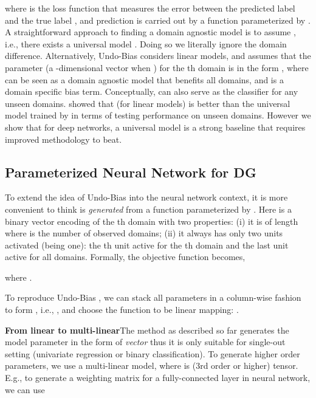 \documentclass[10pt,twocolumn,letterpaper]{article}
\begin{document}
\noindent where  is the loss function that measures the error between the predicted label  and the true label , and  prediction is carried out by a function  parameterized by . A straightforward approach to finding a domain agnostic model is to assume , i.e., there exists a universal model . Doing so we literally ignore the domain difference. Alternatively, Undo-Bias \cite{ECCV12_Khosla} considers linear models, and assumes that the parameter (a -dimensional vector when ) for the th domain is in the form , where  can be seen as a domain agnostic model that benefits all domains, and  is a domain specific bias term. Conceptually,  can also serve as the classifier  for any unseen domains. \cite{ECCV12_Khosla} showed that (for linear models)  is better than the universal model  trained by  in terms of testing performance on unseen domains. However we show that for deep networks, a universal model  is a strong baseline that requires improved methodology to beat.

\subsection{Parameterized Neural Network for DG}

To extend the idea of Undo-Bias \cite{ECCV12_Khosla} into the neural network context, it is more convenient to think  is \emph{generated} from a function  parameterized by . Here  is a binary vector encoding of the th domain with two properties: (i) it is of length  where  is the number of observed domains; (ii) it always has only two units activated (being one): the th unit active for the th domain and the last unit active for all domains. Formally, the objective function becomes,



\noindent where .

To reproduce Undo-Bias \cite{ECCV12_Khosla}, we can stack all parameters in a column-wise fashion to form , i.e., , and choose the  function to be linear mapping: .

\vspace{0.1cm}\noindent\textbf{From linear to multi-linear}\quad The method as described so far generates the model parameter in the form of \emph{vector} thus it is only suitable for single-out setting (univariate regression or binary classification). To generate higher order parameters, we use a multi-linear model, where  is (3rd order or higher) tensor. E.g., to generate a weighting matrix for a fully-connected layer in neural network, we can use
\end{document}
